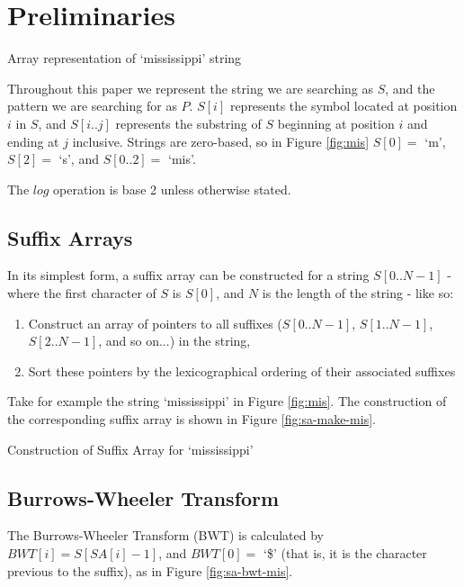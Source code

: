 \section{Preliminaries}

			{Array representation of	`mississippi' string}
			
Throughout this paper we represent the string we are searching as $S$, and the
pattern we are searching for as $P$. $S[i]$ represents the symbol located at
position $i$ in $S$, and $S[i..j]$ represents the substring of $S$ beginning at 
position $i$ and ending at $j$ inclusive. Strings are zero-based, so in Figure \ref{fig:mis} $S[0] = $ `m', $S[2] = $ `s', and $S[0..2] = $ `mis'.

The $log$ operation is base 2 unless otherwise stated.

\subsection{Suffix Arrays}
In its simplest form, a suffix array can be constructed for a string
$S[0..N-1]$ - where the first character of $S$ is $S[0]$, and $N$ is the
length of the string - like so:

\begin{enumerate}
	\item
		Construct an array of pointers to all suffixes ($S[0..N-1]$, 
		$S[1..N-1]$, $S[2..N-1]$, and so on...) in the string,
	\item
		Sort these pointers by the lexicographical ordering of their associated
		suffixes
\end{enumerate}

Take for example the string `mississippi' in Figure \ref{fig:mis}.
The construction of the corresponding suffix array is shown in Figure
\ref{fig:sa-make-mis}.

			{Construction of Suffix Array for `mississippi'}



\subsection{Burrows-Wheeler Transform}
The Burrows-Wheeler Transform (BWT) is calculated by $BWT[i] = S[SA[i]-1]$, and $BWT[0] = $ `\$' (that is, it is the character previous to the suffix), as in Figure \ref{fig:sa-bwt-mis}.

